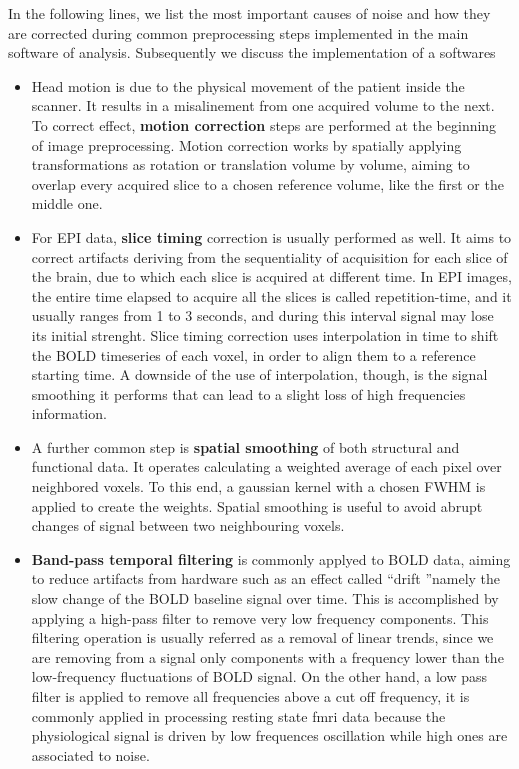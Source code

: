 \documentclass[11pt]{report}
\begin{document}
In the following lines, we list the most important causes of noise and how they are corrected during common preprocessing steps implemented in the main software of analysis. Subsequently we discuss the implementation of a softwares
\begin{itemize}
\item Head motion is due to the physical movement of the patient inside the scanner. It results in a misalinement from one acquired volume to the next.
To correct effect, \textbf{motion correction} steps are performed at the beginning of image preprocessing. Motion correction works by spatially applying transformations as rotation or translation volume by volume, aiming to overlap every acquired slice to a chosen reference volume, like the first or the middle one.

\item For EPI data, \textbf{slice timing} correction is usually performed as well. It aims to correct artifacts deriving from the sequentiality of acquisition for each slice of the brain, due to which each slice is acquired at different time.
In EPI images, the entire time elapsed to acquire all the slices is called repetition-time, and it usually ranges from 1 to 3 seconds, and during this interval signal may lose its initial strenght.
Slice timing correction uses interpolation in time to shift the BOLD timeseries of each voxel, in order to align them to a reference starting time.
A downside of the use of interpolation, though, is the signal smoothing it performs that can lead to a slight loss of high frequencies information.

\item A further common step is \textbf{spatial smoothing} of both structural and functional data. It operates calculating a weighted average of each pixel over neighbored voxels. To this end, a gaussian kernel with a chosen FWHM is applied to create the weights.
Spatial smoothing is useful to avoid abrupt changes of signal between two neighbouring voxels.

\item \textbf{Band-pass temporal filtering} is commonly applyed to BOLD data, aiming to reduce artifacts from hardware such as an effect called \textquotedblleft drift \textquotedblright namely the slow change of the BOLD baseline signal over time. This is accomplished by applying a high-pass filter to remove very low frequency components. This filtering operation is usually referred as a removal of linear trends, since we are removing from a signal only components with a frequency lower than the low-frequency fluctuations of BOLD signal.
On the other hand, a low pass filter is applied to remove all frequencies above a cut off frequency, it is commonly applied in processing resting state fmri data because the physiological signal is driven by low frequences oscillation while high ones are associated to noise.

\end{itemize}
\end{document}
